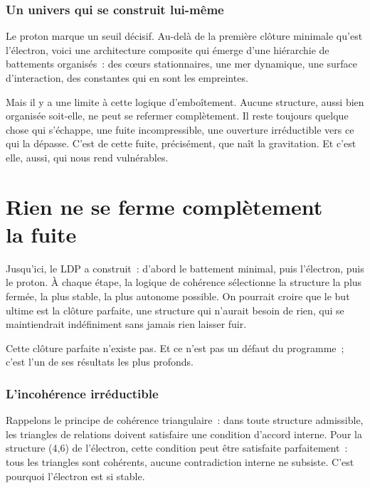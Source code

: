 \documentclass[12pt, a4paper, openright]{book}
\begin{document}
\subsection*{Un univers qui se construit lui-même}

Le proton marque un seuil décisif. Au-delà de la première clôture minimale qu'est l'électron, voici une architecture composite qui émerge d'une hiérarchie de battements organisés~: des c\oe{}urs stationnaires, une mer dynamique, une surface d'interaction, des constantes qui en sont les empreintes.

\medskip

Mais il y a une limite à cette logique d'emboîtement. Aucune structure, aussi bien organisée soit-elle, ne peut se refermer complètement. Il reste toujours quelque chose qui s'échappe, une fuite incompressible, une ouverture irréductible vers ce qui la dépasse. C'est de cette fuite, précisément, que naît la gravitation. Et c'est elle, aussi, qui nous rend vulnérables.

\chapter[Rien ne se ferme complètement --- la fuite]{Rien ne se ferme complètement \\ la fuite}

Jusqu'ici, le LDP a construit~: d'abord le battement minimal, puis l'électron, puis le proton. À chaque étape, la logique de cohérence sélectionne la structure la plus fermée, la plus stable, la plus autonome possible. On pourrait croire que le but ultime est la clôture parfaite, une structure qui n'aurait besoin de rien, qui se maintiendrait indéfiniment sans jamais rien laisser fuir.

\medskip

Cette clôture parfaite n'existe pas. Et ce n'est pas un défaut du programme~; c'est l'un de ses résultats les plus profonds.

\subsection*{L'incohérence irréductible}

Rappelons le principe de cohérence triangulaire~: dans toute structure admissible, les triangles de relations doivent satisfaire une condition d'accord interne. Pour la structure (4,6) de l'électron, cette condition peut être satisfaite parfaitement~: tous les triangles sont cohérents, aucune contradiction interne ne subsiste. C'est pourquoi l'électron est si stable.
\end{document}
